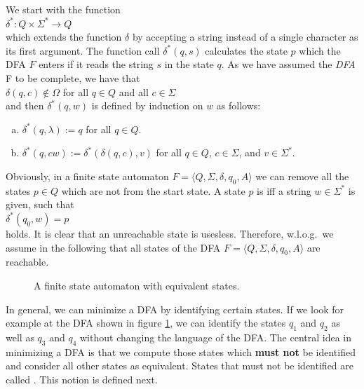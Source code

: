 We start with the function 
\\[0.2cm]
\hspace*{1.3cm}
$\delta^*: Q \times \Sigma^* \rightarrow Q$
\\[0.2cm]
which extends the function $\delta$ by accepting a string instead of a single character as its first argument.
The function call $\delta^*(q,s)$ calculates the state $p$ which the \textsc{DFA} $F$ enters if it reads the
string $s$ in the state $q$. As we have assumed the \textsl{DFA} F to be complete, we have that
\\[0.2cm]
\hspace*{1.3cm}
$\delta(q, c) \not\in \Omega$ \quad for all $q \in Q$ and all $c \in \Sigma$ 
\\[0.2cm]
and then $\delta^*(q,w)$ is defined by induction on $w$ as follows:
\begin{enumerate}[(a)]
\item $\delta^*(q, \lambda) := q$ \quad for all $q \in Q$.
\item $\delta^*(q, cw) := \delta^*(\delta(q, c), v)$ \quad for all $q \in Q$, $c \in \Sigma$, and $v \in \Sigma^*$.
\end{enumerate}

Obviously, in a finite state automaton 
$F = \langle Q, \Sigma, \delta, q_0, A \rangle$ we can remove all the states $p \in Q$ which are not
 from the start state.  A state $p$ is  iff 
a string $w \in \Sigma^*$ is given, such that
\\[0.2cm]
\hspace*{1.3cm}
$\delta^*(q_0, w) = p$
\\[0.2cm]
holds.  It is clear that an unreachable state is usesless.  Therefore, w.l.o.g.~we assume in the following that all
states of the \textsc{DFA} $F =\langle Q, \Sigma, \delta, q_0, A \rangle$ are reachable.  


\begin{figure}[!ht]
  \centering
   \caption{A finite state automaton with equivalent states.}
  \label{fig:nicht-gleichwertig.dot}
\end{figure}

In general, we can minimize a \textsc{DFA} by identifying certain states.   
If we look for example at the \textsc{DFA} shown in figure \ref{fig:nicht-gleichwertig.dot}, we can identify
the states $q_1$ and $q_2$ as well as $q_3$ and $q_4$ without changing the language of the \textsc{DFA}. 
The central idea in minimizing a \textsc{DFA} is that we compute those states which \textbf{must not} be
identified and consider all other states as equivalent.  States that must not be identified are called
.  This notion is defined next.

